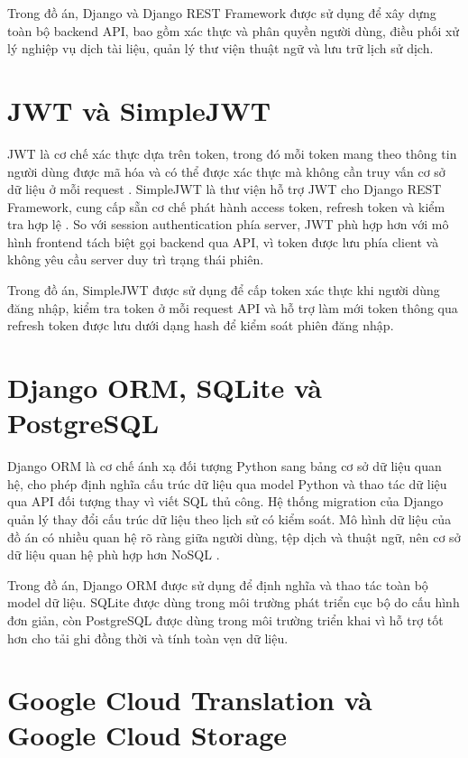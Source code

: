 \documentclass[../DoAn.tex]{subfiles}
\begin{document}
Trong đồ án, Django và Django REST Framework được sử dụng để xây dựng toàn bộ backend API, bao gồm xác thực và phân quyền người dùng, điều phối xử lý nghiệp vụ dịch tài liệu, quản lý thư viện thuật ngữ và lưu trữ lịch sử dịch.

\section{JWT và SimpleJWT}
\label{section:3.3}

JWT là cơ chế xác thực dựa trên token, trong đó mỗi token mang theo thông tin người dùng được mã hóa và có thể được xác thực mà không cần truy vấn cơ sở dữ liệu ở mỗi request \cite{jwt-rfc7519}. SimpleJWT là thư viện hỗ trợ JWT cho Django REST Framework, cung cấp sẵn cơ chế phát hành access token, refresh token và kiểm tra hợp lệ \cite{simplejwt}. So với session authentication phía server, JWT phù hợp hơn với mô hình frontend tách biệt gọi backend qua API, vì token được lưu phía client và không yêu cầu server duy trì trạng thái phiên.

Trong đồ án, SimpleJWT được sử dụng để cấp token xác thực khi người dùng đăng nhập, kiểm tra token ở mỗi request API và hỗ trợ làm mới token thông qua refresh token được lưu dưới dạng hash để kiểm soát phiên đăng nhập.

\section{Django ORM, SQLite và PostgreSQL}
\label{section:3.4}

Django ORM là cơ chế ánh xạ đối tượng Python sang bảng cơ sở dữ liệu quan hệ, cho phép định nghĩa cấu trúc dữ liệu qua model Python và thao tác dữ liệu qua API đối tượng thay vì viết SQL thủ công. Hệ thống migration của Django quản lý thay đổi cấu trúc dữ liệu theo lịch sử có kiểm soát. Mô hình dữ liệu của đồ án có nhiều quan hệ rõ ràng giữa người dùng, tệp dịch và thuật ngữ, nên cơ sở dữ liệu quan hệ phù hợp hơn NoSQL \cite{postgresql}.

Trong đồ án, Django ORM được sử dụng để định nghĩa và thao tác toàn bộ model dữ liệu. SQLite được dùng trong môi trường phát triển cục bộ do cấu hình đơn giản, còn PostgreSQL được dùng trong môi trường triển khai vì hỗ trợ tốt hơn cho tải ghi đồng thời và tính toàn vẹn dữ liệu.

\section{Google Cloud Translation và Google Cloud Storage}
\label{section:3.5}
\end{document}
